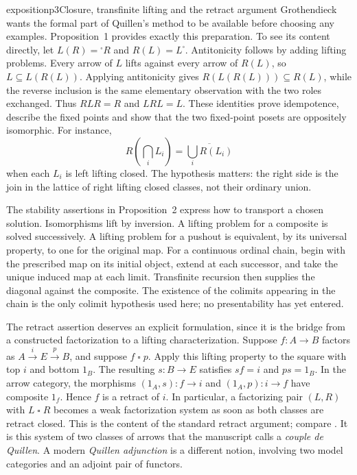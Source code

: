 \begin{dcomment}{exposition}{p3}{Closure, transfinite lifting and the retract argument}
Grothendieck wants the formal part of Quillen's method to be available before choosing any examples. Proposition~1 provides exactly this preparation. To see its content directly, let $L(R)={}^{\square}R$ and $R(L)=L^{\square}$. Antitonicity follows by adding lifting problems. Every arrow of $L$ lifts against every arrow of $R(L)$, so $L\subseteq L(R(L))$. Applying antitonicity gives $R(L(R(L)))\subseteq R(L)$, while the reverse inclusion is the same elementary observation with the two roles exchanged. Thus $RLR=R$ and $LRL=L$. These identities prove idempotence, describe the fixed points and show that the two fixed-point posets are oppositely isomorphic. For instance,
\[
 R\left(\bigcap_iL_i\right)
   =\overline{\bigcup_iR(L_i)}
\]
when each $L_i$ is left lifting closed. The hypothesis matters: the right side is the join in the lattice of right lifting closed classes, not their ordinary union.

The stability assertions in Proposition~2 express how to transport a chosen solution. Isomorphisms lift by inversion. A lifting problem for a composite is solved successively. A lifting problem for a pushout is equivalent, by its universal property, to one for the original map. For a continuous ordinal chain, begin with the prescribed map on its initial object, extend at each successor, and take the unique induced map at each limit. Transfinite recursion then supplies the diagonal against the composite. The existence of the colimits appearing in the chain is the only colimit hypothesis used here; no presentability has yet entered.

The retract assertion deserves an explicit formulation, since it is the bridge from a constructed factorization to a lifting characterization. Suppose $f:A\to B$ factors as $A\xrightarrow{i}E\xrightarrow{p}B$, and suppose $f\mathrel{\square}p$. Apply this lifting property to the square with top $i$ and bottom $1_B$. The resulting $s:B\to E$ satisfies $sf=i$ and $ps=1_B$. In the arrow category, the morphisms $(1_A,s):f\to i$ and $(1_A,p):i\to f$ have composite $1_f$. Hence $f$ is a retract of $i$. In particular, a factorizing pair $(L,R)$ with $L\mathrel{\square}R$ becomes a weak factorization system as soon as both classes are retract closed. This is the content of the standard retract argument; compare \citet[Lemmas~11.1.4 and~11.2.3]{Riehl2014}. It is this system of two classes of arrows that the manuscript calls a \emph{couple de Quillen}. A modern \emph{Quillen adjunction} is a different notion, involving two model categories and an adjoint pair of functors.
\end{dcomment}


